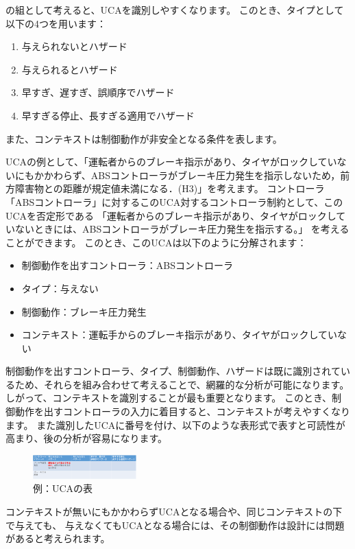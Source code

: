 の組として考えると、UCAを識別しやすくなります。
このとき、タイプとして以下の4つを用います：
%
\begin{enumerate}
    \item 与えられないとハザード
    \item 与えられるとハザード
    \item 早すぎ、遅すぎ、誤順序でハザード
    \item 早すぎる停止、長すぎる適用でハザード
\end{enumerate}
また、コンテキストは制御動作が非安全となる条件を表します。

UCAの例として、「運転者からのブレーキ指示があり、タイヤがロックしていないにもかかわらず、ABSコントローラがブレーキ圧力発生を指示しないため，前方障害物との距離が規定値未満になる．(H3)」を考えます。
コントローラ「ABSコントローラ」に対するこのUCA対するコントローラ制約として、このUCAを否定形である
「運転者からのブレーキ指示があり、タイヤがロックしていないときには、ABSコントローラがブレーキ圧力発生を指示する。」
を考えることができます。
このとき、このUCAは以下のように分解されます：
%
\begin{itemize}
    \item 制御動作を出すコントローラ：ABSコントローラ
    \item タイプ：与えない
    \item 制御動作：ブレーキ圧力発生
    \item コンテキスト：運転手からのブレーキ指示があり、タイヤがロックしていない
\end{itemize}
%
制御動作を出すコントローラ、タイプ、制御動作、ハザードは既に識別されているため、それらを組み合わせて考えることで、網羅的な分析が可能になります。
しがって、コンテキストを識別することが最も重要となります。
このとき、制御動作を出すコントローラの入力に着目すると、コンテキストが考えやすくなります。
また識別したUCAに番号を付け、以下のような表形式で表すと可読性が高まり、後の分析が容易になります。
%
\begin{figure}[H]
    \centering
    \includegraphics[width=40mm]{safety_assurance_contents/ch3images/fig-3-2-3-03.png}
    \caption[short]{例：UCAの表}
\end{figure}

コンテキストが無いにもかかわらずUCAとなる場合や、同じコンテキストの下で与えても、
与えなくてもUCAとなる場合には、その制御動作は設計には問題があると考えられます。

